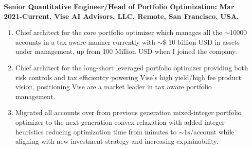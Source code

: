 \documentclass[letterpaper, 12pt]{article}
\renewenvironment{itemize}{
  \begin{list}{}{
    \setlength{\leftmargin}{1.5em}
  }
}{
  \end{list}
}
\begin{document}
\begin{itemize}
  \item \textbf{Senior Quantitative Engineer/Head of Portfolio Optimization: Mar 2021-Current, Vise AI Advisors, LLC, Remote, San Francisco, USA. }
  \begin{enumerate}
       \item[--] Chief architect for the core portfolio optimizer which manages all the $\sim$10000 accounts in a tax-aware manner currently with $\sim$\$ 10 billion USD in assets under management, up from 100 Million USD when I joined the company. 
       \item[--] Chief architect for the long-short leveraged portfolio optimizer providing both risk controls and tax efficientcy powering Vise's high yield/high fee product vision, positioning Vise are a market leader in tax aware portfolio management.
       \item[--] Migrated all accounts over from previous generation mixed-integer portfolio optimizer to the next generation convex relaxation with added integer heuristics reducing optimization time from minutes to $\sim$1s/account while aligning with new investment strategy and increasing explainability.
   \end{enumerate}
  

\end{itemize}
\end{document}
